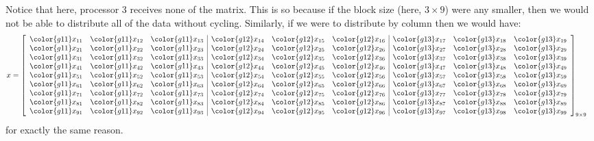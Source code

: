Notice that here, processor {\color{g21}3} receives none of the matrix.  This is so because if the block size (here, $3\times 9$) were any smaller, then we would not be able to distribute all of the data without cycling.  Similarly, if we were to distribute by column then we would have:
\begin{align*}
x &= \left[
      \begin{array}{lll|lll|lll}
      \color{g11}x_{11} & \color{g11}x_{12} & \color{g11}x_{13} & \color{g12}x_{14} & \color{g12}x_{15} & \color{g12}x_{16} & \color{g13}x_{17} & \color{g13}x_{18} & \color{g13}x_{19}\\
      \color{g11}x_{21} & \color{g11}x_{22} & \color{g11}x_{23} & \color{g12}x_{24} & \color{g12}x_{25} & \color{g12}x_{26} & \color{g13}x_{27} & \color{g13}x_{28} & \color{g13}x_{29}\\
      \color{g11}x_{31} & \color{g11}x_{32} & \color{g11}x_{33} & \color{g12}x_{34} & \color{g12}x_{35} & \color{g12}x_{36} & \color{g13}x_{37} & \color{g13}x_{38} & \color{g13}x_{39}\\
      \color{g11}x_{41} & \color{g11}x_{42} & \color{g11}x_{43} & \color{g12}x_{44} & \color{g12}x_{45} & \color{g12}x_{46} & \color{g13}x_{47} & \color{g13}x_{48} & \color{g13}x_{49}\\
      \color{g11}x_{51} & \color{g11}x_{52} & \color{g11}x_{53} & \color{g12}x_{54} & \color{g12}x_{55} & \color{g12}x_{56} & \color{g13}x_{57} & \color{g13}x_{58} & \color{g13}x_{59}\\
      \color{g11}x_{61} & \color{g11}x_{62} & \color{g11}x_{63} & \color{g12}x_{64} & \color{g12}x_{65} & \color{g12}x_{66} & \color{g13}x_{67} & \color{g13}x_{68} & \color{g13}x_{69}\\
      \color{g11}x_{71} & \color{g11}x_{72} & \color{g11}x_{73} & \color{g12}x_{74} & \color{g12}x_{75} & \color{g12}x_{76} & \color{g13}x_{77} & \color{g13}x_{78} & \color{g13}x_{79}\\
      \color{g11}x_{81} & \color{g11}x_{82} & \color{g11}x_{83} & \color{g12}x_{84} & \color{g12}x_{85} & \color{g12}x_{86} & \color{g13}x_{87} & \color{g13}x_{88} & \color{g13}x_{89}\\
      \color{g11}x_{91} & \color{g11}x_{92} & \color{g11}x_{93} & \color{g12}x_{94} & \color{g12}x_{95} & \color{g12}x_{96} & \color{g13}x_{97} & \color{g13}x_{98} & \color{g13}x_{99}\\
      \end{array}
\right]_{9\times 9}
\end{align*}
for exactly the same reason.  

